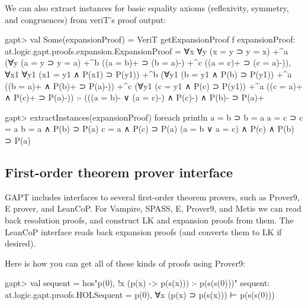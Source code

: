 \documentclass[a4paper,11pt]{article}
\begin{document}
We can also extract instances for basic equality axioms (reflexivity, symmetry,
and congruences) from veriT's proof output:
\begin{clilisting}
gapt> val Some(expansionProof) = VeriT getExpansionProof f
expansionProof: at.logic.gapt.proofs.expansion.ExpansionProof =
∀x ∀y (x = y ⊃ y = x)
  +^{a}
    (∀y (a = y ⊃ y = a)
      +^{b} ((a = b)+ ⊃ (b = a)-)
      +^{c} ((a = c)+ ⊃ (c = a)-)),
∀x1 ∀y1 (x1 = y1 ∧ P(x1) ⊃ P(y1))
  +^{b} (∀y1 (b = y1 ∧ P(b) ⊃ P(y1)) +^{a} ((b = a)+ ∧ P(b)+ ⊃ P(a)-))
  +^{c} (∀y1 (c = y1 ∧ P(c) ⊃ P(y1)) +^{a} ((c = a)+ ∧ P(c)+ ⊃ P(a)-))
:-
(((a = b)- ∨ (a = c)-) ∧ P(c)-) ∧ P(b)- ⊃ P(a)+

gapt> extractInstances(expansionProof) foreach println
a = b ⊃ b = a
a = c ⊃ c = a
b = a ∧ P(b) ⊃ P(a)
c = a ∧ P(c) ⊃ P(a)
(a = b ∨ a = c) ∧ P(c) ∧ P(b) ⊃ P(a)

\end{clilisting}

\subsection{First-order theorem prover interface}

GAPT includes interfaces to several first-order theorem provers, such as
Prover9, E prover, and LeanCoP.  For Vampire, SPASS, E, Prover9, and Metis we can read back
resolution proofs, and construct LK and expansion proofs from them.  The
LeanCoP interface reads back expansion proofs (and converts them to LK if desired).

Here is how you can get all of these kinds of proofs using Prover9:
\begin{clilisting}
gapt> val sequent = hos"p(0), !x (p(x) -> p(s(x))) :- p(s(s(0)))"
sequent: at.logic.gapt.proofs.HOLSequent = p(0), ∀x (p(x) ⊃ p(s(x))) ⊢ p(s(s(0)))

\end{clilisting}
\end{document}
